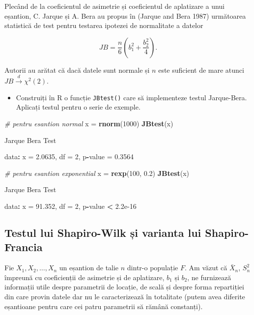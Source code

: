 \documentclass[]{article}
\newenvironment{Shaded}{\begin{snugshade}}{\end{snugshade}}
\newcommand{\KeywordTok}[1]{\textcolor[rgb]{0.13,0.29,0.53}{\textbf{#1}}}
\newcommand{\DecValTok}[1]{\textcolor[rgb]{0.00,0.00,0.81}{#1}}
\newcommand{\FloatTok}[1]{\textcolor[rgb]{0.00,0.00,0.81}{#1}}
\newcommand{\StringTok}[1]{\textcolor[rgb]{0.31,0.60,0.02}{#1}}
\newcommand{\CommentTok}[1]{\textcolor[rgb]{0.56,0.35,0.01}{\textit{#1}}}
\newcommand{\OperatorTok}[1]{\textcolor[rgb]{0.81,0.36,0.00}{\textbf{#1}}}
\newcommand{\NormalTok}[1]{#1}
\newenvironment{frshaded*}{%
  \def\FrameCommand{\fboxrule=\FrameRule\fboxsep=\FrameSep \fcolorbox{framecolor}{shadecolor1}}%
  \MakeFramed {\advance\hsize-\width \FrameRestore}}%
{\endMakeFramed}
\newenvironment{rmdblock}[1]
  {\begin{frshaded*}
  \begin{itemize}
  \renewcommand{\labelitemi}{
    \raisebox{-.7\height}[0pt][0pt]{
      {\setkeys{Gin}{width=2em,keepaspectratio}\texttt{[image: images/icons/\#1]}}
    }
  }
  \item
  }
  {
  \end{itemize}
  \end{frshaded*}
  }
\newenvironment{rmdexercise}
  {\begin{rmdblock}{exercise}}
  {\end{rmdblock}}
\begin{document}
Plecând de la coeficientul de asimetrie și coeficientul de aplatizare a
unui eșantion, C. Jarque și A. Bera au propus în (Jarque and Bera 1987)
următoarea statistică de test pentru testarea ipotezei de normalitate a
datelor

\[
  JB = \frac{n}{6}\left(b_1^2 + \frac{b_2^2}{4}\right).
\]

Autorii au arătat că dacă datele sunt normale și \(n\) este suficient de
mare atunci \(JB\overset{d}{\to}\chi^2(2)\).

\begin{rmdexercise}
Construiți în R o funcție \texttt{JBtest()} care să implementeze testul
Jarque-Bera. Aplicați testul pentru o serie de exemple.
\end{rmdexercise}

\begin{Shaded}
\begin{Highlighting}[]
\CommentTok{# pentru esantion normal }
\NormalTok{x =}\StringTok{ }\KeywordTok{rnorm}\NormalTok{(}\DecValTok{1000}\NormalTok{)}
\KeywordTok{JBtest}\NormalTok{(x)}

\NormalTok{    Jarque Bera Test}

\NormalTok{data}\OperatorTok{:}\StringTok{  }\NormalTok{x}
\NormalTok{=}\StringTok{ }\FloatTok{2.0635}\NormalTok{, df =}\StringTok{ }\DecValTok{2}\NormalTok{, p}\OperatorTok{-}\NormalTok{value =}\StringTok{ }\FloatTok{0.3564}

\CommentTok{# pentru esantion exponential  }
\NormalTok{x =}\StringTok{ }\KeywordTok{rexp}\NormalTok{(}\DecValTok{100}\NormalTok{, }\FloatTok{0.2}\NormalTok{)}
\KeywordTok{JBtest}\NormalTok{(x)}

\NormalTok{    Jarque Bera Test}

\NormalTok{data}\OperatorTok{:}\StringTok{  }\NormalTok{x}
\NormalTok{=}\StringTok{ }\FloatTok{91.352}\NormalTok{, df =}\StringTok{ }\DecValTok{2}\NormalTok{, p}\OperatorTok{-}\NormalTok{value }\OperatorTok{<}\StringTok{ }\FloatTok{2.2e-16}
\end{Highlighting}
\end{Shaded}

\subsection{Testul lui Shapiro-Wilk și varianta lui
Shapiro-Francia}\label{testul-lui-shapiro-wilk-si-varianta-lui-shapiro-francia}

Fie \(X_1, X_2, \ldots, X_n\) un eșantion de talie \(n\) dintr-o
populație \(F\). Am văzut că \(\bar{X}_n\), \(S_n^2\) împreună cu
coeficienții de asimetrie și de aplatizare, \(b_1\) și \(b_2\), ne
furnizează informații utile despre parametrii de locație, de scală și
despre forma repartiției din care provin datele dar nu le caracterizează
în totalitate (putem avea diferite eșantioane pentru care cei patru
parametrii să rămână constanți).
\end{document}
